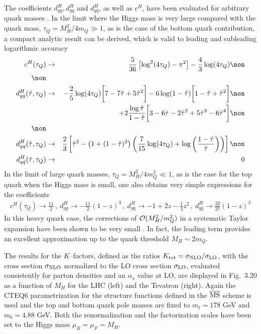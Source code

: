 The coefficients $d_{gg}^H, d_{gq}^H$ and $d_{q \bar{q}}^H$, as well as $c^H$, 
have been evaluated for arbitrary quark masses \cite{ggH-GSZ,AggQCD,SDGZ}.
In the limit where the Higgs mass is very large compared with the quark mass,
$\tau_Q = M_H^2/4m_Q \gg 1$, as is the case of the bottom quark contribution, 
a compact analytic result can be derived, which is valid to leading and  
subleading logarithmic accuracy  
\begin{eqnarray}
c^H(\tau_Q) & \to & \frac{5}{36} \left[ \log^2 (4\tau_Q)-\pi^2\right] 
-\frac{4}{3} \log (4\tau_Q ) \non \\ \non \\
d^H_{gg}(\hat{\tau},\tau_Q) & \to & -\frac{2}{5} \log(4\tau_Q)
\bigg[ 7-7\hat{\tau} +5\hat{\tau}^2 \bigg]
- 6 \log (1-\hat{\tau}) \bigg[ 1-\hat{\tau} +
\hat{\tau}^2  \bigg] \non \\
& & +2\frac{\log \hat{\tau}}{1-\hat{\tau}}
\bigg[ 3-6\hat{\tau} -2\hat{\tau}^2
+5\hat{\tau}^3 - 6\hat{\tau}^4 \bigg] \non \\ \non \\
d^H_{gq}(\hat{\tau},\tau_Q) & \to & \frac{2}{3} \left[ \hat{\tau}^2 -
\left( 1+(1-\hat{\tau})^2 \right) \left( \frac{7}{15} \log (4\tau_Q) +
\log\left( \frac{1-\hat{\tau}}{\hat{\tau}} \right)
\right) \right] \non \\ 
d^H_{q\bar q}(\hat{\tau},\tau_Q) & \to & 0
\label{dij:light}
\end{eqnarray}
In the limit of large quark masses, $\tau_Q = M_H^2/4m_Q^2 \ll 1$, as is the 
case for the top quark when the Higgs mass is small, one also obtains very 
simple expressions for the coefficients 
\begin{eqnarray}
c^H(\tau_Q)  \rightarrow \frac{11}{2} \, , \
d_{gg}^H  \rightarrow  -\frac{11}{2}(1-z)^3 \, , \
d_{gq}^H \rightarrow  -1+2z-\frac{1}{3}z^2 \, , \ 
d_{q\overline{q}}^H \rightarrow  \frac{32}{27}(1-z)^3
\label{dij:heavy}
\end{eqnarray}
In this heavy quark case, the corrections of ${\cal O} (M_H^2/m_Q^2)$ in a
systematic Taylor expansion have been shown to be very small \cite{HggExp}. In 
fact, the leading term provides an excellent approximation up to the quark 
threshold $M_H \sim 2 m_Q$.\s 

The results for the $K$--factors, defined as the ratios $K_{\rm tot}=
\sigma_{\rm NLO}/\sigma_{\rm LO}$, with the cross section $\sigma_{\rm NLO}$ 
normalized to the LO cross section $\sigma_{\rm LO}$, evaluated consistently  
for parton densities and an $\alpha_s$ value at LO, are displayed in Fig.~3.20 
as a function of $M_H$ for the LHC (left) and the Tevatron (right). Again the 
CTEQ6 parametrization for the structure functions defined in the $\overline{\rm
MS}$ scheme is used and the top and bottom quark pole masses are fixed to 
$m_t= 178$ GeV and $m_b=4.88$ GeV. Both the renormalization and the 
factorization scales have been set to the Higgs mass $\mu_R=\mu_F=M_H$.\s

